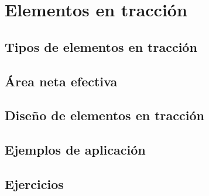 %
%

\chapter{Elementos en tracción}
\section{Tipos de elementos en tracción}
\section{Área neta efectiva}
\section{Diseño de elementos en tracción}
\section{Ejemplos de aplicación}
\section{Ejercicios}